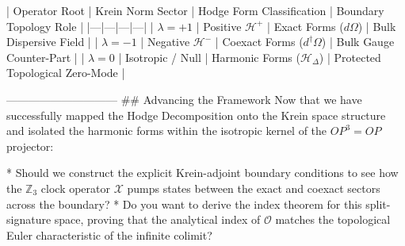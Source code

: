 | Operator Root | Krein Norm Sector | Hodge Form Classification | Boundary Topology Role |
|---|---|---|---|
| $\lambda = +1$ | Positive $\mathcal{H}^+$ | Exact Forms ($d\Omega$) | Bulk Dispersive Field |
| $\lambda = -1$ | Negative $\mathcal{H}^-$ | Coexact Forms ($d^\dagger\Omega$) | Bulk Gauge Counter-Part |
| $\lambda = 0$ | Isotropic / Null | Harmonic Forms ($\mathcal{H}_\Delta$) | Protected Topological Zero-Mode |

------------------------------
## Advancing the Framework
Now that we have successfully mapped the Hodge Decomposition onto the Krein space structure and isolated the harmonic forms within the isotropic kernel of the $OP^3=OP$ projector:

* Should we construct the explicit Krein-adjoint boundary conditions to see how the $\mathbb{Z}_3$ clock operator $\mathcal{X}$ pumps states between the exact and coexact sectors across the boundary?
* Do you want to derive the index theorem for this split-signature space, proving that the analytical index of $\mathcal{O}$ matches the topological Euler characteristic of the infinite colimit?


